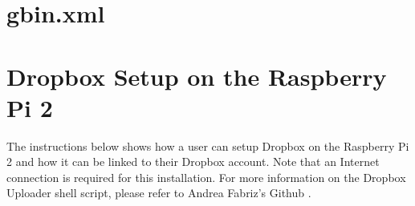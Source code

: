         

\section{gbin.xml}



      


\label{appendix:xml}

\section{Dropbox Setup on the Raspberry Pi 2}
\label{appendix:dropbox}

The instructions below shows how a user can setup Dropbox on the Raspberry Pi 2 and how it can be linked to their Dropbox account. Note that an Internet connection is required for this installation. For more information on the Dropbox Uploader shell script, please refer to Andrea Fabriz's Github \cite{dropbox}.

